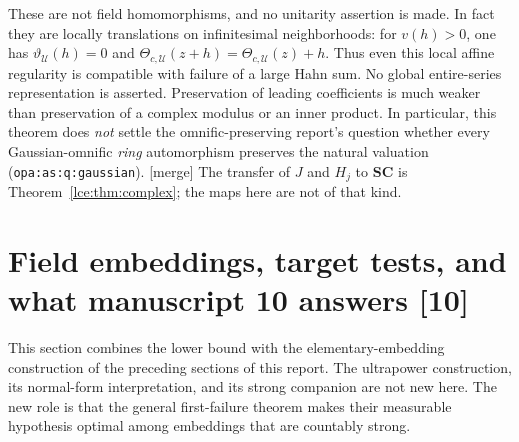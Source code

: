 \documentclass[11pt,letterpaper]{article}
\numberwithin{equation}{section}
\theoremstyle{definition}
\theoremstyle{remark}
\newcommand{\SC}{\mathbf{SC}}
\newcommand{\thref}[1]{Theorem~\ref{#1}}
\newcommand{\src}[1]{\textup{\textsf{\small[#1]}}}%
\newcommand{\mergetag}{\textup{\textsf{\small[merge]}}}%
\newcommand{\lbl}[1]{\nolinkurl{#1}}%
\begin{document}
These are not field homomorphisms, and no unitarity assertion is made. In
fact they are locally translations on infinitesimal neighborhoods: for
$v(h)>0$, one has $\vartheta_{\mathcal U}(h)=0$ and
$\Theta_{c,\mathcal U}(z+h)=\Theta_{c,\mathcal U}(z)+h$. Thus even this
local affine regularity is compatible with failure of a large Hahn sum. No
global entire-series representation is asserted. Preservation of leading
coefficients is much weaker than preservation of a complex modulus or an
inner product. In particular, this theorem does \emph{not} settle the
omnific-preserving report's question whether every Gaussian-omnific
\emph{ring} automorphism preserves the natural valuation
(\lbl{opa:as:q:gaussian}). \mergetag{} The transfer of $J$ and $H_j$ to
$\SC$ is \thref{lce:thm:complex}; the maps here are not of that kind.

\section{Field embeddings, target tests, and what manuscript 10 answers \src{10}}
\label{lce:mf:sec:embeddings}

This section combines the lower bound with the elementary-embedding
construction of the preceding sections of this report. The ultrapower
construction, its normal-form interpretation, and its strong companion are
not new here. The new role is that the general first-failure theorem makes
their measurable hypothesis optimal among embeddings that are countably
strong.
\end{document}
